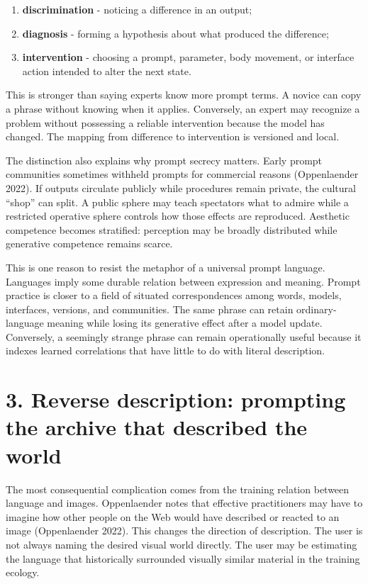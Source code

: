 \documentclass[
  11pt,
  letterpaper,
]{article}
\providecommand{\tightlist}{%
  \setlength{\itemsep}{0pt}\setlength{\parskip}{0pt}}
\begin{document}
\begin{enumerate}
\def\labelenumi{\arabic{enumi}.}
\tightlist
\item
  \textbf{discrimination} - noticing a difference in an output;
\item
  \textbf{diagnosis} - forming a hypothesis about what produced the
  difference;
\item
  \textbf{intervention} - choosing a prompt, parameter, body movement,
  or interface action intended to alter the next state.
\end{enumerate}

This is stronger than saying experts know more prompt terms. A novice
can copy a phrase without knowing when it applies. Conversely, an expert
may recognize a problem without possessing a reliable intervention
because the model has changed. The mapping from difference to
intervention is versioned and local.

The distinction also explains why prompt secrecy matters. Early prompt
communities sometimes withheld prompts for commercial reasons
(Oppenlaender 2022). If outputs circulate publicly while procedures
remain private, the cultural ``shop'' can split. A public sphere may
teach spectators what to admire while a restricted operative sphere
controls how those effects are reproduced. Aesthetic competence becomes
stratified: perception may be broadly distributed while generative
competence remains scarce.

This is one reason to resist the metaphor of a universal prompt
language. Languages imply some durable relation between expression and
meaning. Prompt practice is closer to a field of situated
correspondences among words, models, interfaces, versions, and
communities. The same phrase can retain ordinary-language meaning while
losing its generative effect after a model update. Conversely, a
seemingly strange phrase can remain operationally useful because it
indexes learned correlations that have little to do with literal
description.

\section{3. Reverse description: prompting the archive that described
the
world}\label{reverse-description-prompting-the-archive-that-described-the-world}

The most consequential complication comes from the training relation
between language and images. Oppenlaender notes that effective
practitioners may have to imagine how other people on the Web would have
described or reacted to an image (Oppenlaender 2022). This changes the
direction of description. The user is not always naming the desired
visual world directly. The user may be estimating the language that
historically surrounded visually similar material in the training
ecology.
\end{document}
